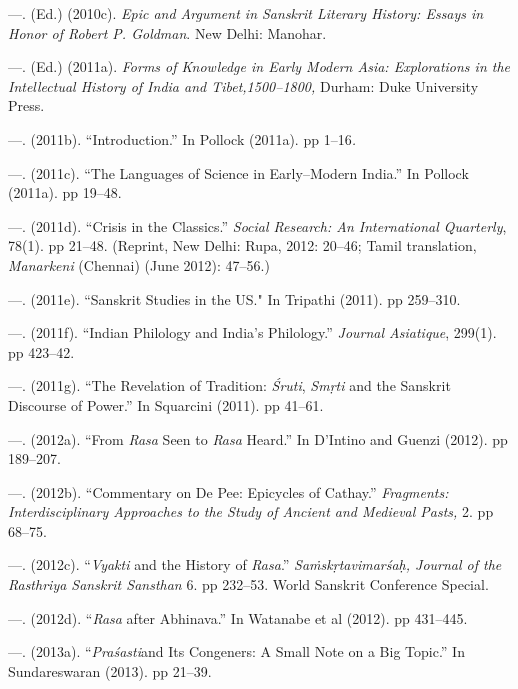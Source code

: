\begin{thebibliography}{99}
 \item —. (Ed.) (2010c). \textit{Epic and Argument in Sanskrit Literary History: Essays in Honor of Robert P. Goldman}. New Delhi: Manohar.

 \item —. (Ed.) (2011a). \textit{Forms of Knowledge in Early Modern Asia: Explorations in the Intellectual History of India and Tibet,1500–1800, }Durham: Duke University Press.

 \item —. (2011b). “Introduction.” In Pollock (2011a). pp 1–16\textit{.}

 \item —. (2011c). “The Languages of Science in Early–Modern India.” In Pollock (2011a). pp 19–48.

 \item —. (2011d). “Crisis in the Classics.” \textit{ Social Research: An International Quarterly}, 78(1). pp 21–48. (Reprint, New Delhi: Rupa, 2012: 20–46; Tamil translation, \textit{Manarkeni} (Chennai) (June 2012): 47–56.)

 \item —. (2011e). “Sanskrit Studies in the US." In Tripathi (2011). pp 259–310. 

 \item —. (2011f). “Indian Philology and India’s Philology.” \textit{Journal Asiatique}, 299(1). pp 423–42.

 \item —. (2011g). “The Revelation of Tradition: \textit{Śruti}, \textit{Smṛti} and the Sanskrit Discourse of Power.” In Squarcini (2011). pp 41–61.

 \item —. (2012a). “From \textit{Rasa} Seen to \textit{Rasa} Heard.” In D’Intino and Guenzi (2012). pp 189–207.

 \item —. (2012b). “Commentary on De Pee: Epicycles of Cathay.” \textit{Fragments: Interdisciplinary Approaches to the Study of Ancient and Medieval Pasts,} 2. pp 68–75.

 \item —. (2012c). “\textit{Vyakti} and the History of \textit{Rasa}.” \textit{Saṁskṛtavimarśaḥ, Journal of the Rasthriya Sanskrit Sansthan} 6. pp 232–53. World Sanskrit Conference Special.

 \item —. (2012d). “\textit{Rasa} after Abhinava.” In Watanabe et al (2012). pp 431–445.

 \item —. (2013a). “\textit{Praśasti}and Its Congeners: A Small Note on a Big Topic.” In Sundareswaran (2013). pp 21–39.


\end{thebibliography}
